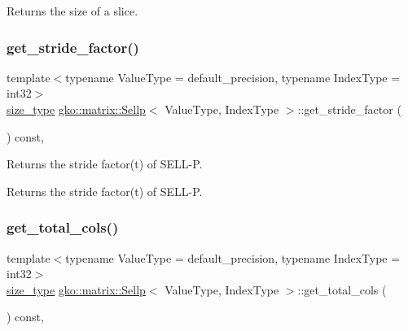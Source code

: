 \begin{DoxyReturn}{Returns}
the size of a slice. 
\end{DoxyReturn}
\mbox{\label{classgko_1_1matrix_1_1Sellp_a34c7942cac3db5a9c4c0b609d2a5540b}} 
\subsubsection{\texorpdfstring{get\+\_\+stride\+\_\+factor()}{get\_stride\_factor()}}
{\footnotesize\ttfamily template$<$typename Value\+Type = default\+\_\+precision, typename Index\+Type = int32$>$ \\
\hyperlink{namespacegko_a6e5c95df0ae4e47aab2f604a22d98ee7}{size\+\_\+type} \hyperlink{classgko_1_1matrix_1_1Sellp}{gko\+::matrix\+::\+Sellp}$<$ Value\+Type, Index\+Type $>$\+::get\+\_\+stride\+\_\+factor (\begin{DoxyParamCaption}{ }\end{DoxyParamCaption}) const\hspace{0.3cm}{\ttfamily [inline]}, {\ttfamily [noexcept]}}



Returns the stride factor(t) of S\+E\+L\+L-\/P. 

\begin{DoxyReturn}{Returns}
the stride factor(t) of S\+E\+L\+L-\/P. 
\end{DoxyReturn}
\mbox{\label{classgko_1_1matrix_1_1Sellp_a3e5ca0f4968f29f97b5a42aac4d08b3d}} 
\subsubsection{\texorpdfstring{get\+\_\+total\+\_\+cols()}{get\_total\_cols()}}
{\footnotesize\ttfamily template$<$typename Value\+Type = default\+\_\+precision, typename Index\+Type = int32$>$ \\
\hyperlink{namespacegko_a6e5c95df0ae4e47aab2f604a22d98ee7}{size\+\_\+type} \hyperlink{classgko_1_1matrix_1_1Sellp}{gko\+::matrix\+::\+Sellp}$<$ Value\+Type, Index\+Type $>$\+::get\+\_\+total\+\_\+cols (\begin{DoxyParamCaption}{ }\end{DoxyParamCaption}) const\hspace{0.3cm}{\ttfamily [inline]}, {\ttfamily [noexcept]}}



